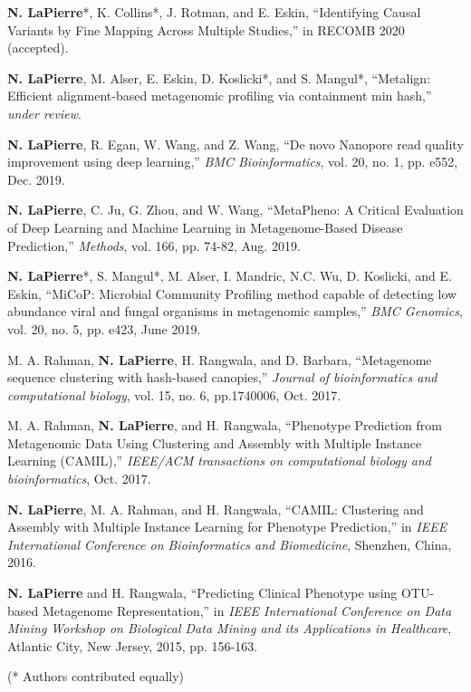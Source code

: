 \documentclass[margin, 10pt]{res} %
\begin{document}
\begin{resume}
\textbf{N. LaPierre}*, K. Collins*, J. Rotman, and E. Eskin, ``Identifying Causal Variants by Fine Mapping Across Multiple Studies,'' in RECOMB 2020 (accepted).

\textbf{N. LaPierre}, M. Alser, E. Eskin, D. Koslicki*, and S. Mangul*, ``Metalign: Efficient alignment-based metagenomic profiling via containment min hash,'' \emph{under review}.

\textbf{N. LaPierre}, R. Egan, W. Wang, and Z. Wang, ``De novo Nanopore read quality improvement using deep learning,'' \emph{BMC Bioinformatics}, vol. 20, no. 1, pp. e552, Dec. 2019.

\textbf{N. LaPierre}, C. Ju, G. Zhou, and W. Wang, ``MetaPheno: A Critical Evaluation of Deep Learning and Machine Learning in Metagenome-Based Disease Prediction,'' \emph{Methods}, vol. 166, pp. 74-82, Aug. 2019.

\textbf{N. LaPierre}*, S. Mangul*, M. Alser, I. Mandric, N.C. Wu, D. Koslicki, and E. Eskin, ``MiCoP: Microbial Community Profiling method capable of detecting low abundance viral and fungal organisms in metagenomic samples,'' \emph{BMC Genomics}, vol. 20, no. 5, pp. e423, June 2019.

M. A. Rahman, \textbf{N. LaPierre}, H. Rangwala, and D. Barbara, ``Metagenome sequence clustering with hash-based canopies,'' \emph{Journal of bioinformatics and computational biology}, vol. 15, no. 6, pp.1740006, Oct. 2017.

M. A. Rahman, \textbf{N. LaPierre}, and H. Rangwala, ``Phenotype Prediction from Metagenomic Data Using Clustering and Assembly with Multiple Instance Learning (CAMIL),'' \emph{IEEE/ACM transactions on computational biology and bioinformatics}, Oct. 2017. 

\textbf{N. LaPierre}, M. A. Rahman, and H. Rangwala, ``CAMIL: Clustering and Assembly with Multiple Instance Learning for Phenotype Prediction,'' in {\sl IEEE International Conference on Bioinformatics and Biomedicine}, Shenzhen, China, 2016.

\textbf{N. LaPierre} and H. Rangwala, ``Predicting Clinical Phenotype using OTU-based Metagenome Representation,'' in {\sl IEEE International Conference on Data Mining Workshop on Biological Data Mining and its Applications in Healthcare}, Atlantic City, New Jersey, 2015, pp. 156-163.

(*  Authors contributed equally)



\end{resume}
\end{document}

